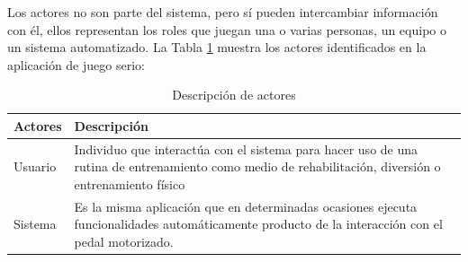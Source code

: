 Los actores no son parte del sistema, pero sí pueden intercambiar información con él, ellos representan los roles que juegan una o varias personas, un equipo o un sistema automatizado. La Tabla \ref{tab: actores} muestra los actores identificados en la aplicación de juego serio:

\begin{table}[ht]
    \centering
    \begin{tabularx}{\textwidth}{|l|X|}
        \hline
        \textbf{Actores} & \textbf{Descripción} \\\hline
        Usuario & Individuo que interactúa con el sistema para hacer uso de una rutina de entrenamiento
        como medio de rehabilitación, diversión o entrenamiento físico \\\hline
        Sistema & Es la misma aplicación que en determinadas ocasiones ejecuta funcionalidades automáticamente producto de la interacción con el pedal motorizado. \\\hline
    \end{tabularx}
    \caption{Descripción de actores}
    \label{tab: actores}
\end{table}

